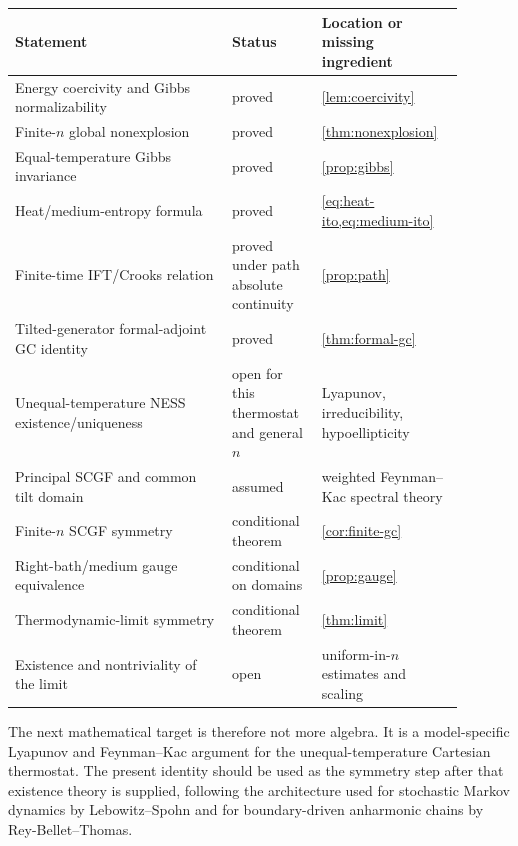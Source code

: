 \documentclass[11pt]{article}
\theoremstyle{remark}
\begin{document}
\begin{center}
\small
\begin{tabular}{>{\raggedright\arraybackslash}p{0.44\linewidth}
                >{\raggedright\arraybackslash}p{0.18\linewidth}
                >{\raggedright\arraybackslash}p{0.27\linewidth}}
\toprule
Statement & Status & Location or missing ingredient\\
\midrule
Energy coercivity and Gibbs normalizability & proved & \cref{lem:coercivity}\\
Finite-$n$ global nonexplosion & proved & \cref{thm:nonexplosion}\\
Equal-temperature Gibbs invariance & proved & \cref{prop:gibbs}\\
Heat/medium-entropy formula & proved & \cref{eq:heat-ito,eq:medium-ito}\\
Finite-time IFT/Crooks relation & proved under path absolute continuity & \cref{prop:path}\\
Tilted-generator formal-adjoint GC identity & proved & \cref{thm:formal-gc}\\
Unequal-temperature NESS existence/uniqueness & open for this thermostat and general $n$ & Lyapunov, irreducibility, hypoellipticity\\
Principal SCGF and common tilt domain & assumed & weighted Feynman--Kac spectral theory\\
Finite-$n$ SCGF symmetry & conditional theorem & \cref{cor:finite-gc}\\
Right-bath/medium gauge equivalence & conditional on domains & \cref{prop:gauge}\\
Thermodynamic-limit symmetry & conditional theorem & \cref{thm:limit}\\
Existence and nontriviality of the limit & open & uniform-in-$n$ estimates and scaling\\
\bottomrule
\end{tabular}
\end{center}

The next mathematical target is therefore not more algebra.  It is a
model-specific Lyapunov and Feynman--Kac argument for the
unequal-temperature Cartesian thermostat.  The present identity should be
used as the symmetry step after that existence theory is supplied, following
the architecture used for stochastic Markov dynamics by
Lebowitz--Spohn and for boundary-driven anharmonic chains by
Rey-Bellet--Thomas.
\end{document}
